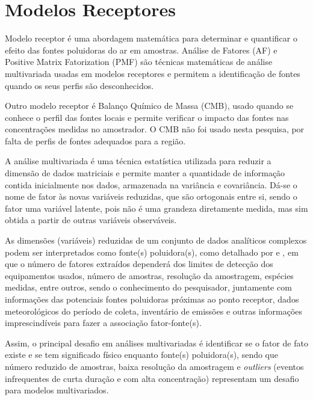 \section{Modelos Receptores}

Modelo receptor é uma abordagem matemática para determinar e 
quantificar o efeito das fontes poluidoras do ar em amostras.
Análise de Fatores (AF) e Positive Matrix Fatorization (PMF) são técnicas 
matemáticas de análise multivariada usadas em modelos receptores e 
permitem a identificação de fontes quando os seus perfis são desconhecidos.

Outro modelo receptor é Balanço Químico de Massa (CMB), usado quando se conhece 
o perfil das fontes locais e permite verificar o impacto das fontes 
nas concentrações medidas no amostrador. O CMB não foi usado nesta pesquisa, 
por falta de perfis de fontes adequados para a região.

A análise multivariada é uma técnica estatística utilizada para 
reduzir a dimensão de dados matriciais e permite manter a quantidade de 
informação contida inicialmente nos dados, armazenada na variância e covariância. 
Dá-se o nome de fator às novas variáveis reduzidas, que são ortogonais entre si,  
sendo o fator uma variável latente, pois não é uma grandeza diretamente
medida, mas sim obtida a partir de outras variáveis observáveis. 

As dimensões (variáveis) reduzidas de um conjunto de dados analíticos 
complexos podem ser interpretados como fonte(s) poluidora(s), como detalhado por
\citet{wang2012} e \citet{mansha2012}, em que o número de fatores extraídos 
dependerá dos limites de detecção dos equipamentos usados, número de amostras, 
resolução da amostragem, espécies medidas, entre outros, sendo o conhecimento 
do pesquisador, juntamente com informações das potenciais fontes poluidoras 
próximas ao ponto receptor, dados meteorológicos do período de coleta, 
inventário de emissões e outras informações imprescindíveis para fazer a
associação fator-fonte(s). 

Assim, o principal desafio em análises multivariadas
é identificar se o fator de fato existe e se tem significado físico 
enquanto fonte(s) poluidora(s), sendo que número reduzido de amostras, 
baixa resolução da amostragem e \textit{outliers} 
(eventos infrequentes de curta duração e com alta concentração) representam 
um desafio para modelos multivariados.


